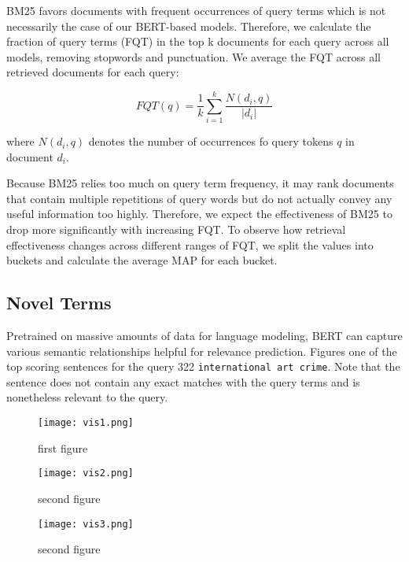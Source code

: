 BM25 favors documents with frequent occurrences of query terms which is not necessarily the case of our BERT-based models.
Therefore, we calculate the fraction of query terms (FQT) in the top k documents for each query across all models, removing stopwords and punctuation.
We average the FQT across all retrieved documents for each query:

\begin{equation}
FQT(q) = \frac{1}{k} \sum^k _{i=1} \frac{N(d_i, q)}{|d_i|}
\end{equation}

where $ N(d_i, q) $ denotes the number of occurrences fo query tokens $ q $ in document $ d_i $.

Because BM25 relies too much on query term frequency, it may rank documents that contain multiple repetitions of query words but do not actually convey any useful information too highly.
Therefore, we expect the effectiveness of BM25 to drop more significantly with increasing FQT.
To observe how retrieval effectiveness changes across different ranges of FQT, we split the values into  buckets and calculate the average MAP for each bucket.

\subsection{Novel Terms}

Pretrained on massive amounts of data for language modeling, BERT can capture various semantic relationships helpful for relevance prediction.
Figures  one of the top scoring sentences for the query 322 \texttt{international art crime}.
Note that the sentence does not contain any exact matches with the query terms and is nonetheless relevant to the query.


\begin{figure}
	\centering
    \begin{minipage}{0.45\textwidth}
        \centering
        \texttt{[image: vis1.png]} %
        \caption{first figure}
    \end{minipage}\hfill
    \begin{minipage}{0.45\textwidth}
        \centering
        \texttt{[image: vis2.png]} %
        \caption{second figure}
    \end{minipage}\hfill
    \begin{minipage}{0.45\textwidth}
        \centering
        \texttt{[image: vis3.png]} %
        \caption{second figure}
    \end{minipage}
\end{figure}

